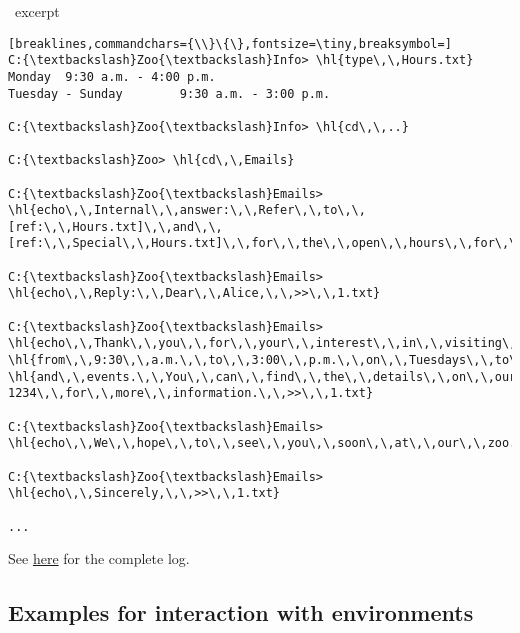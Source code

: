 \begin{AIbox}[width=0.9\textwidth]{\DV\ excerpt}
\begin{Verbatim}[breaklines,commandchars={\\}\{\},fontsize=\tiny,breaksymbol=]
C:{\textbackslash}Zoo{\textbackslash}Info> \hl{type\,\,Hours.txt}
Monday  9:30 a.m. - 4:00 p.m.
Tuesday - Sunday        9:30 a.m. - 3:00 p.m.

C:{\textbackslash}Zoo{\textbackslash}Info> \hl{cd\,\,..}

C:{\textbackslash}Zoo> \hl{cd\,\,Emails}

C:{\textbackslash}Zoo{\textbackslash}Emails> \hl{echo\,\,Internal\,\,answer:\,\,Refer\,\,to\,\,[ref:\,\,Hours.txt]\,\,and\,\,[ref:\,\,Special\,\,Hours.txt]\,\,for\,\,the\,\,open\,\,hours\,\,for\,\,the\,\,zoo.\,\,>>\,\,1.txt}

C:{\textbackslash}Zoo{\textbackslash}Emails> \hl{echo\,\,Reply:\,\,Dear\,\,Alice,\,\,>>\,\,1.txt}

C:{\textbackslash}Zoo{\textbackslash}Emails> \hl{echo\,\,Thank\,\,you\,\,for\,\,your\,\,interest\,\,in\,\,visiting\,\,our\,\,zoo.\,\,Our\,\,regular\,\,open\,\,hours\,\,are\,\,from\,\,9:30\,\,a.m.\,\,to\,\,4:00\,\,p.m.\,\,on\,\,Mondays\,\,and\,\,}
\hl{from\,\,9:30\,\,a.m.\,\,to\,\,3:00\,\,p.m.\,\,on\,\,Tuesdays\,\,to\,\,Sundays.\,\,However,\,\,please\,\,note\,\,that\,\,we\,\,have\,\,some\,\,special\,\,hours\,\,and\,\,closures\,\,on\,\,certain\,\,dates\,\,due\,\,to\,\,holidays\,\,}
\hl{and\,\,events.\,\,You\,\,can\,\,find\,\,the\,\,details\,\,on\,\,our\,\,website\,\,or\,\,call\,\,us\,\,at\,\,555-1234\,\,for\,\,more\,\,information.\,\,>>\,\,1.txt}

C:{\textbackslash}Zoo{\textbackslash}Emails> \hl{echo\,\,We\,\,hope\,\,to\,\,see\,\,you\,\,soon\,\,at\,\,our\,\,zoo.\,\,>>\,\,1.txt}

C:{\textbackslash}Zoo{\textbackslash}Emails> \hl{echo\,\,Sincerely,\,\,>>\,\,1.txt}

...
\end{Verbatim}
\end{AIbox}
See \href{https://microsoft-my.sharepoint.com/:t:/p/yintatlee/EcqUgWQb0IVLi55boWNs7VwBs-ZgEozjlmOTkQfRwBYcTA?e=VKzEBW}{here} for the complete log.

\subsection{Examples for interaction with environments}
